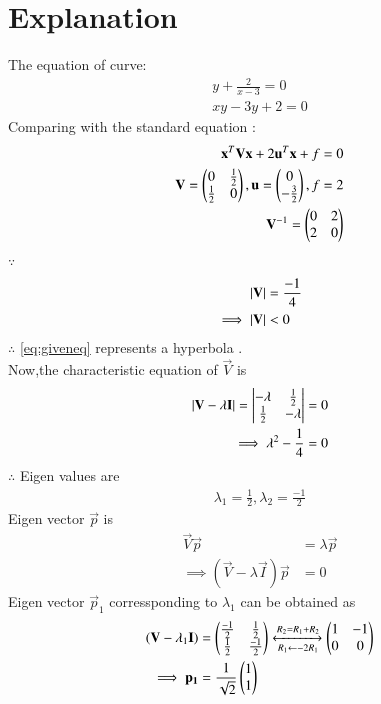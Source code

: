 \documentclass[journal,12pt,twocolumn]{IEEEtran}
\begin{document}
\section{Explanation}
The equation of curve:
\begin{align}
  y+\frac{2}{x-3}=0  \\
  xy-3y+2=0\label{eq:giveneq}
\end{align}
Comparing with the standard equation :
\begin{align}
\mathbf{x}^T\mathbf{V}\mathbf{x}+2\mathbf{u}^T\mathbf{x}+f=0\\
\mathbf{V}=\begin{pmatrix}0&\frac{1}{2}\\\frac{1}{2}&0\end{pmatrix},\mathbf{u}=\begin{pmatrix}0\\-\frac{3}{2}\end{pmatrix},f=2\\
\mathbf{V}^{-1}=\begin{pmatrix}0&2\\2&0\end{pmatrix}
\end{align}
$\because$
\begin{align}
    \vert\mathbf{V}\vert &= \frac{-1}{4}
    \\
    \implies \vert\mathbf{V}\vert &< 0
\end{align}
$\therefore$ \eqref{eq:giveneq} represents a hyperbola .
\\
Now,the characteristic equation of $\vec{V}$ is 
\begin{align}
    \vert\mathbf{V} - \lambda\mathbf{I}\vert = \begin{vmatrix}-\lambda & \frac{1}{2} \\ \frac{1}{2} & -\lambda\end{vmatrix} &= 0
    \\
    \implies \lambda^2 - \frac{1}{4} &= 0
\end{align}
$\therefore$ Eigen values are 
\begin{align}
    \lambda_1 = \frac{1}{2} , \lambda_2 = \frac{-1}{2}
\end{align}
Eigen vector $\vec{p}$ is 
\begin{align}
    \vec{V}\vec{p} &= \lambda\vec{p}
    \\
    \implies (\vec{V} - \lambda\vec{I})\vec{p} &= 0
\end{align}
Eigen vector $\vec{p}_1$ corressponding to $\lambda_1$ can be obtained as
\begin{align}
    (\mathbf{V} - \lambda_1\mathbf{I}) &= \begin{pmatrix}\frac{-1}{2} & \frac{1}{2} \\ \frac{1}{2} & \frac{-1}{2}\end{pmatrix}\xleftrightarrow[R_1 \leftarrow -2R_1]{R_2 = R_1 + R_2}\begin{pmatrix}1 & -1 \\ 0 & 0\end{pmatrix}
    \\
    \implies \mathbf{p_1} &= \frac{1}{\sqrt{2}}\begin{pmatrix}1 \\ 1\end{pmatrix}
\end{align}
\end{document}
